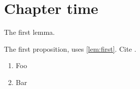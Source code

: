 \chapter{Chapter time}

\begin{lemma}\label{lem:first}
  The first lemma.
\end{lemma}
\begin{proposition}\label{prop:fprop}
  The first proposition, uses \cref{lem:first}. Cite \cite{specker-choice-nf}.
  \begin{enumerate}
    \item Foo
    \item Bar
  \end{enumerate}
\end{proposition}



